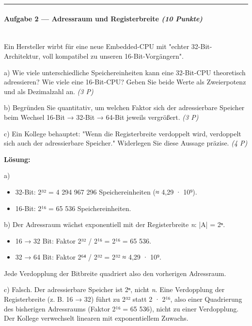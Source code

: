 \documentclass[11pt, a4paper]{article}
\begin{document}
\noindent\textcolor{rulegray}{\rule{\linewidth}{0.4pt}}


\paragraph{Aufgabe 2 — Adressraum und Registerbreite \textit{(10 Punkte)}}\mbox{}\\[2pt]

Ein Hersteller wirbt für eine neue Embedded-CPU mit "echter 32-Bit-Architektur, voll kompatibel zu unseren 16-Bit-Vorgängern".


a) Wie viele unterschiedliche Speichereinheiten kann eine 32-Bit-CPU theoretisch adressieren? Wie viele eine 16-Bit-CPU? Geben Sie beide Werte als Zweierpotenz und als Dezimalzahl an. \textit{(3 P)}


b) Begründen Sie quantitativ, um welchen Faktor sich der adressierbare Speicher beim Wechsel 16-Bit → 32-Bit → 64-Bit jeweils vergrößert. \textit{(3 P)}


c) Ein Kollege behauptet: "Wenn die Registerbreite verdoppelt wird, verdoppelt sich auch der adressierbare Speicher." Widerlegen Sie diese Aussage präzise. \textit{(4 P)}


\textbf{Lösung:}


a)

\begin{itemize}
  \item 32-Bit: 2³² = 4 294 967 296 Speichereinheiten (≈ 4,29 · 10⁹).
  \item 16-Bit: 2¹⁶ = 65 536 Speichereinheiten.
\end{itemize}

b) Der Adressraum wächst exponentiell mit der Registerbreite \textit{n}: |A| = 2ⁿ.

\begin{itemize}
  \item 16 → 32 Bit: Faktor 2³² / 2¹⁶ = 2¹⁶ = 65 536.
  \item 32 → 64 Bit: Faktor 2⁶⁴ / 2³² = 2³² ≈ 4,29 · 10⁹.
\end{itemize}
Jede Verdopplung der Bitbreite quadriert also den vorherigen Adressraum.


c) Falsch. Der adressierbare Speicher ist 2ⁿ, nicht \textit{n}. Eine Verdopplung der Registerbreite (z. B. 16 → 32) führt zu 2³² statt 2 · 2¹⁶, also einer Quadrierung des bisherigen Adressraums (Faktor 2¹⁶ = 65 536), nicht zu einer Verdopplung. Der Kollege verwechselt linearen mit exponentiellem Zuwachs.
\end{document}
